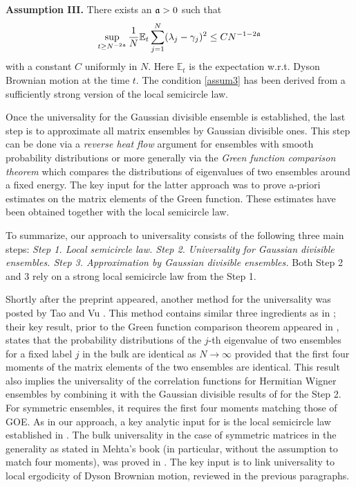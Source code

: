 \documentclass[draft]{article}
\newcommand{\fa}{{\frak a}}
\newcommand{\be}{\begin{equation}}
\newcommand{\ee}{\end{equation}}
\newcommand{\la}{\lambda}
\newcommand{\E}{{\mathbb E }}
\numberwithin{equation}{section}
\numberwithin{theorem}{section}
\numberwithin{definition}{section}
\numberwithin{remark}{section}
\begin{document}
\medskip

{\bf Assumption III.} There exists an $\fa>0$ such that
\be
 \sup_{ t \ge N^{-2\fa}}  \frac{1}{N} \E_t \sum_{j=1}^N(\la_j-\gamma_j)^2
  \le CN^{-1-2\fa}
\label{assum3}
\ee
with a constant $C$ uniformly in $N$. Here $\E_t$ is the expectation w.r.t. Dyson Brownian motion at the time $t$. 
The condition \eqref{assum3} has been derived from a sufficiently strong
version of the local semicircle law.



Once the universality for the Gaussian divisible ensemble is established, the last
 step is to approximate 
all matrix ensembles by  Gaussian divisible ones.  This step can be done via a 
{\it reverse heat flow} 
argument \cite{EPRSY, ESYY}  for ensembles with  smooth probability distributions 
or more generally via  the {\it Green function comparison theorem} \cite{EYY} 
which compares the distributions of eigenvalues of two ensembles around a fixed energy.
 The key input
for the latter approach was to prove a-priori  estimates on the 
 matrix elements of the Green function. These estimates  have been
obtained together with the local semicircle law.

To summarize, 
our approach to universality consists of  the following three  main steps: 
{\it Step 1.  Local semicircle law.  Step 2.   Universality for Gaussian divisible ensembles. 
Step 3.  Approximation by Gaussian divisible ensembles. }
Both Step 2 and 3 rely on a strong  local semicircle law from the Step 1. 








Shortly after the preprint \cite{EPRSY}  appeared, 
another  method for the universality  was posted  by Tao and Vu \cite{TV}. 
 This method contains similar three ingredients as in  \cite{EPRSY}; 
their key result,  prior to the 
Green function comparison theorem appeared in \cite{EYY},
states that the
probability distributions of the $j$-th eigenvalue of two ensembles  for a fixed label 
 $j$ in the bulk 
are identical as $N\to\infty$ 
 provided that the first four moments of the matrix elements
 of the  two ensembles  are identical.  
This result also implies the universality of the  correlation functions for  Hermitian
Wigner ensembles \cite{TV} 
by combining it with 
the Gaussian divisible results of \cite{J, BP} for the Step 2.  For symmetric ensembles, 
 it requires the first four moments 
matching those of GOE. 
As in our approach,  a  key analytic input for \cite{TV} is the local semicircle law established in \cite{ESY2}.
The bulk universality  in the case of symmetric matrices in the  generality  as stated in Mehta's book \cite{M}  (in particular, 
without the assumption to match four moments),   was proved in  \cite{ESY4, EYY2}. The key input is to link 
universality to local ergodicity of Dyson Brownian motion,   reviewed in the previous paragraphs. 
\end{document}
